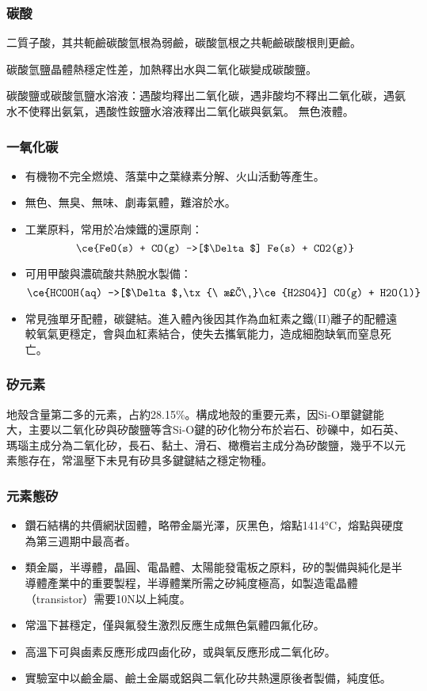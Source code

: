 \documentclass[a4paper,12pt]{report}
\begin{document}
\subsubsection{碳酸}
\bit
\item 二質子酸，其共軛鹼碳酸氫根為弱鹼，碳酸氫根之共軛鹼碳酸根則更鹼。
\item 碳酸氫鹽晶體熱穩定性差，加熱釋出水與二氧化碳變成碳酸鹽。
\item 碳酸鹽或碳酸氫鹽水溶液：遇酸均釋出二氧化碳，遇非酸均不釋出二氧化碳，遇氨水不使釋出氨氣，遇酸性銨鹽水溶液釋出二氧化碳與氨氣。
\eit
{}
無色液體。
\subsubsection{一氧化碳}
\begin{itemize}
\item 有機物不完全燃燒、落葉中之葉綠素分解、火山活動等產生。
\item 無色、無臭、無味、劇毒氣體，難溶於水。
\item 工業原料，常用於冶煉鐵的還原劑：
\[\ce{FeO(s) + CO(g) ->[$\Delta$] Fe(s) + CO2(g)}\]
\item 可用甲酸與濃硫酸共熱脫水製備：
\[\ce{HCOOH(aq) ->[$\Delta$,\tx{\ 濃\ }\ce{H2SO4}] CO(g) + H2O(l)}\]
\item 常見強單牙配體，碳鍵結。進入體內後因其作為血紅素之鐵(II)離子的配體遠較氧氣更穩定，會與血紅素結合，使失去攜氧能力，造成細胞缺氧而窒息死亡。
\end{itemize}
\subsubsection{矽元素}
地殼含量第二多的元素，占約28.15\%。構成地殼的重要元素，因Si-O單鍵鍵能大，主要以二氧化矽與矽酸鹽等含Si-O鍵的矽化物分布於岩石、砂礫中，如石英、瑪瑙主成分為二氧化矽，長石、黏土、滑石、橄欖岩主成分為矽酸鹽，幾乎不以元素態存在，常溫壓下未見有矽具多鍵鍵結之穩定物種。
\subsubsection{元素態矽}
\begin{itemize}
\item 鑽石結構的共價網狀固體，略帶金屬光澤，灰黑色，熔點1414°C，熔點與硬度為第三週期中最高者。
\item 類金屬，半導體，晶圓、電晶體、太陽能發電板之原料，矽的製備與純化是半導體產業中的重要製程，半導體業所需之矽純度極高，如製造電晶體（transistor）需要10N以上純度。
\item 常溫下甚穩定，僅與氟發生激烈反應生成無色氣體四氟化矽。
\item 高溫下可與鹵素反應形成四鹵化矽，或與氧反應形成二氧化矽。
\item  實驗室中以鹼金屬、鹼土金屬或鋁與二氧化矽共熱還原後者製備，純度低。
\end{itemize}
\end{document}

